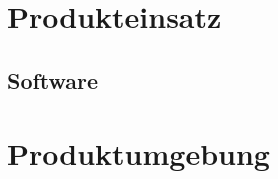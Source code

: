\documentclass[pflichtenheft.tex]{subfiles}
\begin{document}
\chapter{Produkteinsatz}
\section{Software}

\chapter{Produktumgebung}
\end{document}
